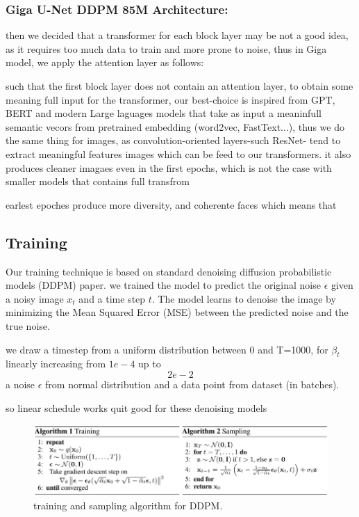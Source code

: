 \documentclass[twocolumn,superscriptaddress,aps]{revtex4-1}
\begin{document}
\subsubsection{Giga U-Net DDPM 85M Architecture:}
 then we decided that a transformer for each block layer may be not a good idea, as it requires too much data to train and more prone to noise, thus in Giga model, we apply the attention layer as follows:


such that the first block layer does not contain an attention layer, to obtain some meaning full input for the transformer, our best-choice is inspired from GPT, BERT and modern Large laguages models that take as input a meaninfull semantic vecors from pretrained embedding (word2vec, FastText...), thus we do the same thing for images, as convolution-oriented layers-such ResNet- tend to extract meaningful features images which can be feed to our transformers.
it also produces cleaner imagaes even in the first epochs, which is not the case with smaller models that contains full transfrom

earlest epoches produce more diversity, and coherente faces which means that  

\subsection{Training}

Our training technique is based on standard denoising diffusion probabilistic models (DDPM) paper. we trained the model to predict the original noise $\epsilon$ given a noisy image $x_t$ and a time step $t$. The model learns to denoise the image by minimizing the Mean Squared Error (MSE) between the predicted noise and the true noise.

we draw a timestep from a uniform distribution between 0 and T=1000, for $\beta_t$ linearly increasing from $1e-4$ up to $$2e-2$$ a noise $\epsilon$ from normal distribution and a data point from dataset (in batches).

so linear schedule works quit good for these denoising models
\begin{figure}[ht]
  \centering
  \includegraphics[width=\textwidth]{figures/training-sampling-algo-ddpm.png}
  \caption{training and sampling algorithm for DDPM.}
  \label{fig:train-sampling-algo-ddpm}
\end{figure}
\end{document}
